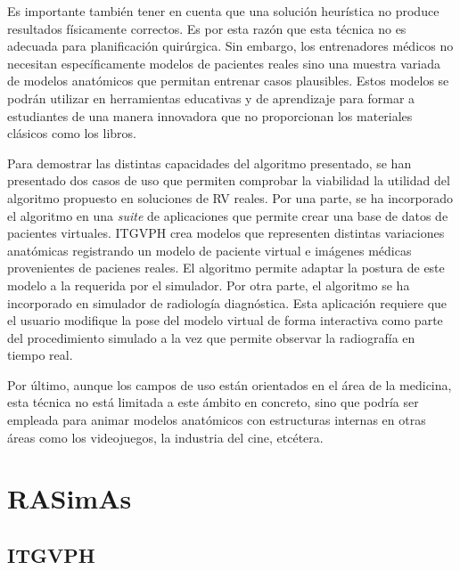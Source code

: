 Es importante también tener en cuenta que una solución heurística no produce resultados físicamente correctos. Es por esta razón que esta técnica no es adecuada para planificación quirúrgica. Sin embargo, los entrenadores médicos no necesitan específicamente modelos de pacientes reales sino una muestra variada de modelos anatómicos que permitan entrenar casos plausibles. Estos modelos se podrán utilizar en herramientas educativas y de aprendizaje para formar a estudiantes de una manera innovadora que no proporcionan los materiales clásicos como los libros.

Para demostrar las distintas capacidades del algoritmo presentado, se han presentado dos casos de uso que permiten comprobar la viabilidad la utilidad del algoritmo propuesto en soluciones de \ac{RV} reales. 
%
Por una parte, se ha incorporado el algoritmo en una \emph{suite} de aplicaciones que permite crear una base de datos de pacientes virtuales.
\ac{ITGVPH} crea modelos que representen distintas  variaciones anatómicas registrando un modelo de paciente virtual e imágenes médicas provenientes de pacienes reales. 
El algoritmo permite 
adaptar la postura de este modelo a la requerida por el simulador.
%
Por otra parte, el algoritmo se ha incorporado en simulador de radiología diagnóstica. Esta aplicación requiere que el usuario modifique la pose del modelo virtual de forma interactiva como parte del procedimiento simulado a la vez que permite observar la radiografía en tiempo real. %


Por último, aunque los campos de uso están orientados en el área de la medicina, esta técnica no está limitada a este ámbito en concreto, sino que podría ser empleada para animar modelos anatómicos con estructuras internas en otras áreas como los videojuegos, la industria del cine, etcétera.
 

\section{RASimAs}


\subsection{ITGVPH}
\label{conclu:herramienta}

